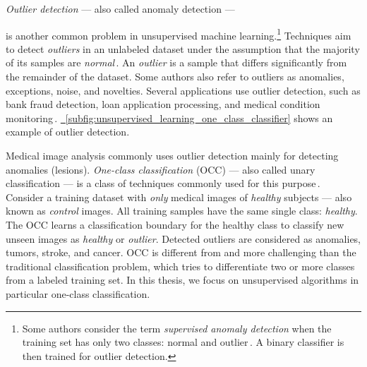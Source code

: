 \emph{Outlier detection} --- also called anomaly detection --- 
\addtocounter{footnote}{-1} %
is another common problem in unsupervised machine learning.\footnote{Some authors consider the term \emph{supervised anomaly detection} when the training set has only two classes: normal and outlier\,\cite{Hodge-2004-SurveyOutlier}. A binary classifier is then trained for outlier detection.} Techniques aim to detect \emph{outliers} in an unlabeled dataset under the assumption that the majority of its samples are \emph{normal}\,\cite{Hodge-2004-SurveyOutlier}. An \emph{outlier} is a sample that differs significantly from the remainder of the dataset. Some authors also refer to outliers as anomalies, exceptions, noise, and novelties. Several applications use outlier detection, such as bank fraud detection, loan application processing, and medical condition monitoring\,\cite{Hodge-2004-SurveyOutlier}. \hyperref[subfig:unsupervised_learning_one_class_classifier]{\fig~\ref{subfig:unsupervised_learning_one_class_classifier}} shows an example of outlier detection.


Medical image analysis commonly uses outlier detection mainly for detecting anomalies (lesions). \emph{One-class classification} (OCC) --- also called unary classification --- is a class of techniques commonly used for this purpose\,\cite{Mourao-2011-NEURO-PatientOutlierDetection,Martins-2019-ISBI-SAAD,Martins-2020-BIOIMAGING-BADRESC,Tang-2019-ISBI-AbnormalChestOneClass,Baur-2018-MICCAI-DeepAutoencoding}. Consider a training dataset with \emph{only} medical images of \emph{healthy} subjects --- also known as \emph{control} images. All training samples have the same single class: \emph{healthy}. The OCC learns a classification boundary for the healthy class to classify new unseen images as \emph{healthy} or \emph{outlier}. Detected outliers are considered as anomalies, \eg tumors, stroke, and cancer. OCC is different from and more challenging than the traditional classification problem, which tries to differentiate two or more classes from a labeled training set. In this thesis, we focus on unsupervised algorithms in particular one-class classification.


